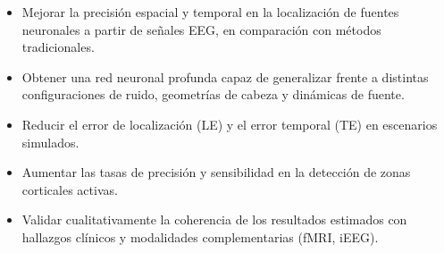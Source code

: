 \begin{itemize}
    \item Mejorar la precisión espacial y temporal en la localización de fuentes neuronales a partir de señales EEG, en comparación con métodos tradicionales.
    \item Obtener una red neuronal profunda capaz de generalizar frente a distintas configuraciones de ruido, geometrías de cabeza y dinámicas de fuente.
    \item Reducir el error de localización (LE) y el error temporal (TE) en escenarios simulados.
    \item Aumentar las tasas de precisión y sensibilidad en la detección de zonas corticales activas.
    \item Validar cualitativamente la coherencia de los resultados estimados con hallazgos clínicos y modalidades complementarias (fMRI, iEEG).
\end{itemize}